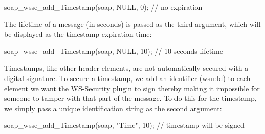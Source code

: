 \begin{DoxyCode}
    soap_wsse_add_Timestamp(soap, NULL, 0); // no expiration
\end{DoxyCode}


The lifetime of a message (in seconds) is passed as the third argument, which will be displayed as the timestamp expiration time:


\begin{DoxyCode}
    soap_wsse_add_Timestamp(soap, NULL, 10); // 10 seconds lifetime
\end{DoxyCode}


Timestamps, like other header elements, are not automatically secured with a digital signature. To secure a timestamp, we add an identifier (wsu:Id) to each element we want the WS-\/Security plugin to sign thereby making it impossible for someone to tamper with that part of the message. To do this for the timestamp, we simply pass a unique identification string as the second argument:


\begin{DoxyCode}
    soap_wsse_add_Timestamp(soap, "Time", 10); // timestamp will be signed
\end{DoxyCode}
 